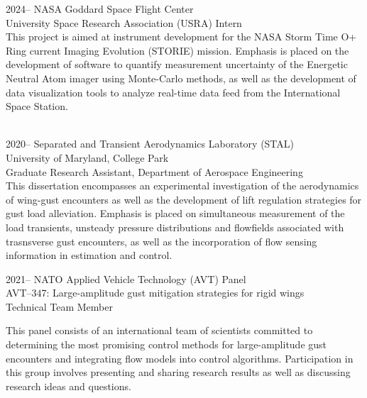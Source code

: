 \documentclass[12pt,letterpaper]{report}
\begin{document}
    \begin{tablist}

        \item[2024--]   \tab{}NASA Goddard Space Flight Center \\ 
        University Space Research Association (USRA) Intern \\
        
    \vspace{1.5mm}
        This project is aimed at instrument development for the NASA Storm Time O+ Ring current
        Imaging Evolution (STORIE) mission. Emphasis is placed on the development of software to quantify measurement uncertainty of the
        Energetic Neutral Atom imager using Monte-Carlo methods, as well as the development of data visualization tools to analyze real-time data feed from the International Space Station. \\\

        \item[2020--]   \tab{}Separated and Transient Aerodynamics Laboratory (STAL) \\ 
        University of Maryland, College Park \\ 
        Graduate Research Assistant, Department of Aerospace Engineering  \\
        
  \vspace{1.5mm}
        This dissertation encompasses an experimental investigation of the aerodynamics of wing-gust encounters as well as the development of lift regulation strategies for gust load alleviation. 
        Emphasis is placed on simultaneous measurement of the load transients, unsteady pressure distributions and flowfields associated with trasnsverse gust encounters, as well as the incorporation 
        of flow sensing information in estimation and control.         
                        

		\item[2021--]   \tab{}NATO Applied Vehicle Technology (AVT) Panel \\ 
		AVT--$347$: Large-amplitude gust mitigation strategies for rigid wings \\
		Technical Team Member \\
		
		\vspace{1.5mm}
		
		This panel consists of an international team of scientists committed to determining the most promising control methods for large-amplitude gust encounters and integrating flow models into control algorithms. Participation in this group involves presenting and sharing research results as well as discussing research ideas and questions. \\\
		 



\end{tablist}
\end{document}
